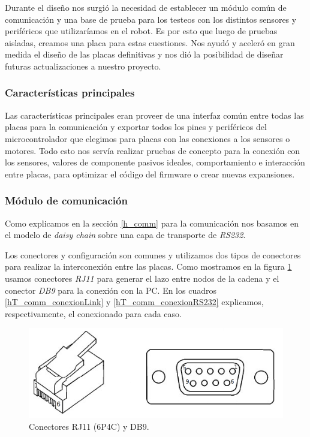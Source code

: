 Durante el dise\~no nos surgi\'o la necesidad de establecer un m\'odulo com\'un de comunicaci\'on y una base de prueba para
los testeos con los distintos sensores y perif\'ericos que utilizar\'iamos en el robot.
Es por esto que luego de pruebas aisladas, creamos una placa para estas cuestiones.
Nos ayud\'o y aceler\'o en gran medida el dise\~no de las placas definitivas y nos di\'o la posibilidad de dise\~nar futuras
actualizaciones a nuestro proyecto.

\subsubsection{Caracter\'isticas principales}
\label{h_placas_generica_caracteristicas}

Las caracter\'isticas principales eran proveer de una interfaz com\'un entre todas las placas para la comunicaci\'on y exportar
todos los pines y perif\'ericos del microcontrolador que elegimos para placas con las conexiones a los sensores o motores.
Todo esto nos serv\'ia realizar pruebas de concepto para la conexi\'on con los sensores, valores de componente pasivos ideales,
comportamiento e interacci\'on entre placas, para optimizar el c\'odigo del firmware o crear nuevas expansiones.

\subsubsection{M\'odulo de comunicaci\'on}
\label{h_placas_generica_comm}

Como explicamos en la secci\'on \ref{h_comm} para la comunicaci\'on nos basamos en el modelo de \emph{daisy chain} sobre una
capa de transporte de \emph{RS232}.

Los conectores y configuraci\'on son comunes y utilizamos dos tipos de conectores para realizar la interconexi\'on entre las placas.
Como mostramos en la figura \ref{hF_placa_gen_comm} usamos conectores \emph{RJ11} para generar el lazo entre nodos de la cadena y el
conector \emph{DB9} para la conexi\'on con la PC.
En los cuadros \ref{hT_comm_conexionLink} y \ref{hT_comm_conexionRS232} explicamos, respectivamente, el conexionado para cada caso.

\begin{figure}[ht]
	\centering
	\includegraphics[scale=.25]{figuras/rj11_db9.png}
	\caption{Conectores RJ11 (6P4C) y DB9.}
	\label{hF_placa_gen_comm}
\end{figure}

